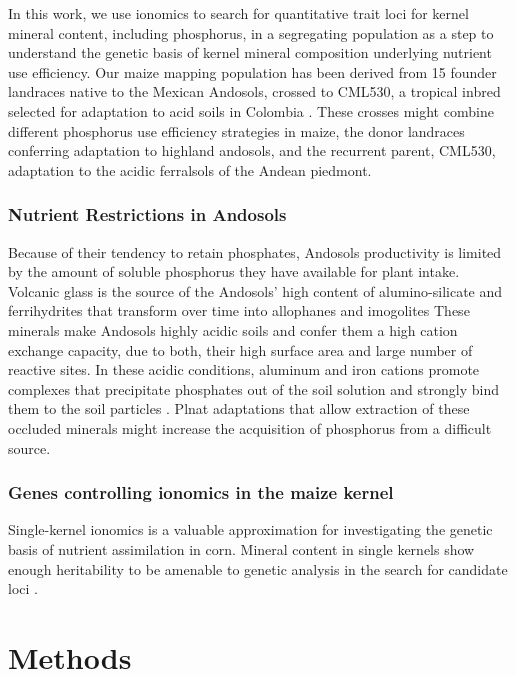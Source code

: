 In this work, we use ionomics to search for quantitative trait loci for kernel mineral content, including phosphorus, in a segregating population as a step to understand the genetic basis of kernel mineral composition underlying nutrient use efficiency.
Our maize mapping population has been derived from 15 founder landraces native to the Mexican Andosols, crossed to CML530, a tropical inbred selected for adaptation to acid soils in Colombia \citep{granados1995}.
These crosses might combine different phosphorus use efficiency strategies in maize, the donor landraces conferring adaptation to highland andosols, and the recurrent parent, CML530, adaptation to the acidic ferralsols of the Andean piedmont.

\subsubsection{Nutrient Restrictions in Andosols}

Because of their tendency to retain phosphates, Andosols productivity is limited by the amount of soluble phosphorus they have available for plant intake. Volcanic glass is the source of the Andosols’ high content of alumino-silicate and ferrihydrites that transform over time into allophanes and imogolites \citep{wrb2022}
These minerals make Andosols highly acidic soils and confer them a high cation exchange capacity, due to both, their high surface area and large number of reactive sites.
In these acidic conditions, aluminum and iron cations promote complexes that precipitate phosphates out of the soil solution and strongly bind them to the soil particles \citep{krasilnikov2013}. Plnat adaptations that allow extraction of these occluded minerals might increase the acquisition of phosphorus from a difficult source.

\subsubsection{Genes controlling ionomics in the maize kernel}

Single-kernel ionomics is a valuable approximation for investigating the genetic basis of nutrient  assimilation in corn.
Mineral content in single kernels show enough heritability to be amenable to genetic analysis in the search for candidate loci \citep{baxter2014,baxter2013}. 

\section{Methods}

